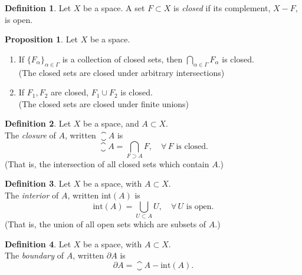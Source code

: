 \documentclass[a5paper]{article}
\theoremstyle{definition}%
\newtheorem{proposition}[theorem]{Proposition}
\newtheorem*{definition*}{Definition}
\numberwithin{exercise}{section}
\theoremstyle{remark}%
\begin{document}
\begin{definition*}
Let $X$ be a space. A set $F\subset X$ is \emph{closed} if its complement, $X-F$, is open. 
\end{definition*}

\begin{highlight}
\begin{proposition}
Let $X$ be a space. 
\begin{enumerate}[label=(\alph*)]
\item If $\{F_\alpha\}_{\alpha\in\Gamma}$ is a collection of closed sets, then $\bigcap_{\alpha\in\Gamma} F_\alpha$ is closed. \\
(The closed sets are closed under arbitrary intersections)
\item If $F_1, F_2$ are closed, $F_1\cup F_2$ is closed. \\
(The closed sets are closed under finite unions)
\end{enumerate}
\end{proposition}
\end{highlight}

\begin{highlight}
\begin{definition*}
Let $X$ be a space, and $A \subset X$. \\
The \emph{closure} of $A$, written $\closure{A}$ is $$\closure{A} = \bigcap_{F\supset A} F, \quad \forall \, F\text{ is closed}.$$
(That is, the intersection of all closed sets which contain $A$.) 
\end{definition*}
\end{highlight}

\begin{highlight}
\begin{definition*}
Let  $X$ be a space, with $A \subset X$. \\
The \emph{interior} of $A$, written int$(A)$ is $$\text{int}(A) = \bigcup_{U\subset A} U, \quad \forall \, U\text{ is open}.$$
(That is, the union of all open sets which are subsets of $A$.)
\end{definition*}
\end{highlight}

\begin{highlight}
\begin{definition*}
Let  $X$ be a space, with $A \subset X$. \\
The \emph{boundary} of $A$, written $\partial A$ is
$$\partial A = \closure{A} -\text{int}(A).$$
\end{definition*}
\end{highlight}
\end{document}
